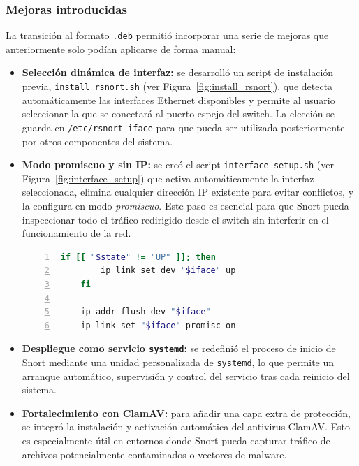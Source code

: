 \documentclass[11pt,a4paper,twoside]{report}
\begin{document}
\subsubsection{Mejoras introducidas}

La transición al formato \texttt{.deb} permitió incorporar una serie de mejoras que anteriormente solo podían aplicarse de forma manual:

\begin{itemize}
	\item \textbf{Selección dinámica de interfaz:} se desarrolló un script de instalación previa, \texttt{install\_rsnort.sh} (ver Figura~\ref{fig:install_rsnort}), que detecta automáticamente las interfaces Ethernet disponibles y permite al usuario seleccionar la que se conectará al puerto espejo del switch. La elección se guarda en \texttt{/etc/rsnort\_iface} para que pueda ser utilizada posteriormente por otros componentes del sistema.
	
	\item \textbf{Modo promiscuo y sin IP:} se creó el script \texttt{interface\_setup.sh} (ver Figura~\ref{fig:interface_setup}) que activa automáticamente la interfaz seleccionada, elimina cualquier dirección IP existente para evitar conflictos, y la configura en modo \textit{promiscuo}. Este paso es esencial para que Snort pueda inspeccionar todo el tráfico redirigido desde el switch sin interferir en el funcionamiento de la red.
	
	\begin{lstlisting}[language=bash, caption={Activación automática del modo promiscuo en interface\_setup.sh}, label=lst:promiscuo, basicstyle=\ttfamily\footnotesize, frame=single, numbers=left, numberstyle=\tiny, breaklines=true]
	if [[ "$state" != "UP" ]]; then
		ip link set dev "$iface" up
	fi
	
	ip addr flush dev "$iface"
	ip link set "$iface" promisc on
	\end{lstlisting}
	
	\item \textbf{Despliegue como servicio \texttt{systemd}:} se redefinió el proceso de inicio de Snort mediante una unidad personalizada de \texttt{systemd}, lo que permite un arranque automático, supervisión y control del servicio tras cada reinicio del sistema.
	
	\item \textbf{Fortalecimiento con ClamAV:} para añadir una capa extra de protección, se integró la instalación y activación automática del antivirus ClamAV. Esto es especialmente útil en entornos donde Snort pueda capturar tráfico de archivos potencialmente contaminados o vectores de malware.
\end{itemize}
\end{document}
